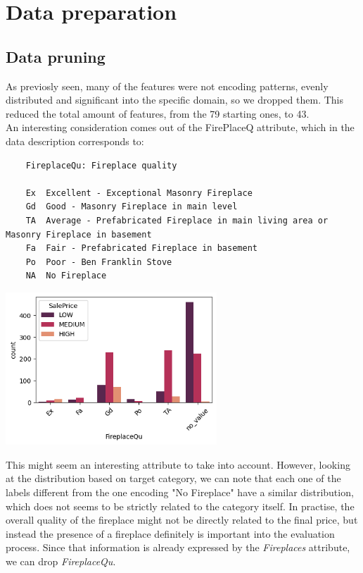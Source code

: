 \chapter{Data preparation}
\label{sec:data_preparation}

\section{Data pruning}
As previosly seen, many of the features were not encoding patterns, evenly distributed and significant into the specific domain, so we dropped them.
This reduced the total amount of features, from the 79 starting ones, to 43. \\
An interesting consideration comes out of the FirePlaceQ attribute, which in the data description corresponds to:
\begin{verbatim}
    FireplaceQu: Fireplace quality

    Ex	Excellent - Exceptional Masonry Fireplace
    Gd	Good - Masonry Fireplace in main level
    TA	Average - Prefabricated Fireplace in main living area or Masonry Fireplace in basement
    Fa	Fair - Prefabricated Fireplace in basement
    Po	Poor - Ben Franklin Stove
    NA	No Fireplace
\end{verbatim}
\begin{center}
    \includegraphics*[width=300px]{imgs/FirePlaceQu.png}
    \label{FirePlaceQu distribution}
\end{center}
This might seem an interesting attribute to take into account. However, looking at the distribution based on target category, we can note that each one of the labels different from the one encoding "No Fireplace" have a similar distribution, which does not seems to be strictly related to the category itself. 
In practise, the overall quality of the fireplace might not be directly related to the final price, but instead the presence of a fireplace definitely is important into the evaluation process. Since that information is already expressed by the \emph{Fireplaces} attribute, we can drop \emph{FireplaceQu}.


